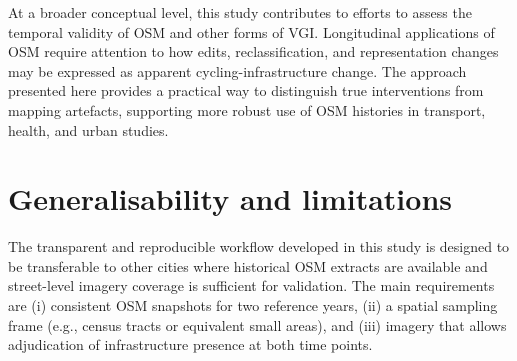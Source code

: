 \documentclass[
]{article}
\begin{document}
At a broader conceptual level, this study contributes to efforts to
assess the temporal validity of OSM and other forms of VGI. Longitudinal
applications of OSM require attention to how edits, reclassification,
and representation changes may be expressed as apparent
cycling-infrastructure change. The approach presented here provides a
practical way to distinguish true interventions from mapping artefacts,
supporting more robust use of OSM histories in transport, health, and
urban studies.

\section{Generalisability and
limitations}\label{generalisability-and-limitations}

The transparent and reproducible workflow developed in this study is
designed to be transferable to other cities where historical OSM
extracts are available and street-level imagery coverage is sufficient
for validation. The main requirements are (i) consistent OSM snapshots
for two reference years, (ii) a spatial sampling frame (e.g., census
tracts or equivalent small areas), and (iii) imagery that allows
adjudication of infrastructure presence at both time points.
\end{document}
